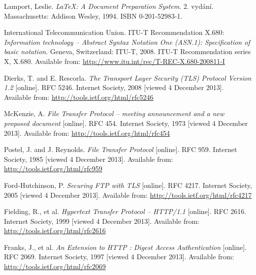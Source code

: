 
\def\bibname{Bibliography}
\begin{thebibliography}{99}
\addcontentsline{toc}{chapter}{\bibname}

  {\sc Lamport,} Leslie.
  \emph{\LaTeX: A Document Preparation System}.
  2. vydání.
  Massachusetts: Addison Wesley, 1994.
  ISBN 0-201-52983-1.


	{\sc International Telecommunication Union}.
	ITU-T Recommendation X.680:
	\emph{Information technology -- Abstract Syntax Notation One (ASN.1): Specification of basic notation}.
	Geneva, Switzerland: ITU-T, 2008.
	ITU-T Recommendation series X, X.680.
	Available from: \url{http://www.itu.int/rec/T-REC-X.680-200811-I}

	{\sc Dierks,} T. and E. {\sc Rescorla}.
	\emph{The Transport Layer Security (TLS) Protocol Version 1.2}
	[online].
	RFC 5246.
	Internet Society, 2008 [viewed 4 December 2013].
	Available from: \url{http://tools.ietf.org/html/rfc5246}


	{\sc McKenzie,} A.
	\emph{File Transfer Protocol -- meeting announcement and a new proposed document}
	[online].
	RFC 454.
	Internet Society, 1973 [viewed 4 December 2013].
	Available from: \url{http://tools.ietf.org/html/rfc454}

	{\sc Postel,} J. and J. {\sc Reynolds}.
	\emph{File Transfer Protocol}
	[online].
	RFC 959.
	Internet Society, 1985 [viewed 4 December 2013].
	Available from: \url{http://tools.ietf.org/html/rfc959}

	{\sc Ford-Hutchinson,} P.
	\emph{Securing FTP with TLS}
	[online].
	RFC 4217.
	Internet Society, 2005 [viewed 4 December 2013].
	Available from: \url{http://tools.ietf.org/html/rfc4217}

	{\sc Fielding,} R., et al.
	\emph{Hypertext Transfer Protocol -- HTTP/1.1}
	[online].
	RFC 2616.
	Internet Society, 1999 [viewed 4 December 2013].
	Available from: \url{http://tools.ietf.org/html/rfc2616}

	{\sc Franks,} J., et al.
	\emph{An Extension to HTTP : Digest Access Authentication}
	[online].
	RFC 2069.
	Internet Society, 1997 [viewed 4 December 2013].
	Available from: \url{http://tools.ietf.org/html/rfc2069}


\end{thebibliography}
